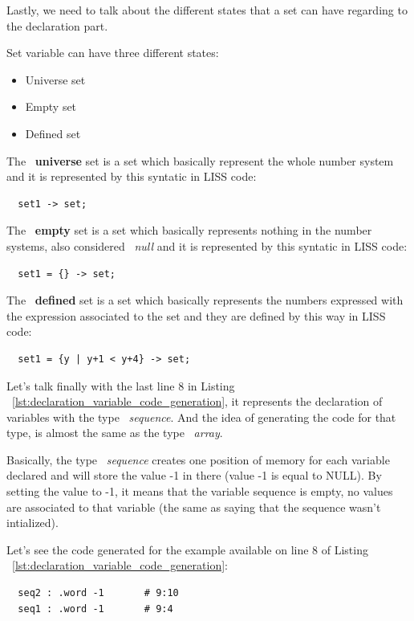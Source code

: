 \documentclass[
  oneside,
  11pt, a4paper,
  footinclude=true,
  headinclude=true,
  cleardoublepage=empty
]{scrbook}
\begin{document}
Lastly, we need to talk about the different states that a set can have regarding to the declaration part.

Set variable can have three different states:

\begin{itemize}
\item Universe set
\item Empty set
\item Defined set
\end{itemize}

The ~\textbf{universe} set is a set which basically represent the whole number system and it is represented by this syntatic in LISS code:

\begin{lstlisting}
  set1 -> set;
\end{lstlisting}

The ~\textbf{empty} set is a set which basically represents nothing in the number systems, also considered ~\textit{null} and it is represented by this syntatic in LISS code:

\begin{lstlisting}
  set1 = {} -> set;
\end{lstlisting}

The ~\textbf{defined} set is a set which basically represents the numbers expressed with the expression associated to the set and they are defined by this way in LISS code:

\begin{lstlisting}
  set1 = {y | y+1 < y+4} -> set;
\end{lstlisting}

Let's talk finally with the last line 8 in Listing ~\ref{lst:declaration_variable_code_generation}, it represents the declaration of variables with the type ~\textit{sequence}. And the idea of generating the code for that type, is almost the same as the type ~\textit{array}.

Basically, the type ~\textit{sequence} creates one position of memory for each variable declared and will store the value -1 in there (value -1 is equal to NULL). By setting the value to -1, it means that the variable sequence is empty, no values are associated to that variable (the same as saying that the sequence wasn't intialized).

Let's see the code generated for the example available on line 8 of Listing ~\ref{lst:declaration_variable_code_generation}:

\begin{lstlisting}
  seq2 : .word -1		# 9:10
  seq1 : .word -1		# 9:4
\end{lstlisting}
\end{document}

